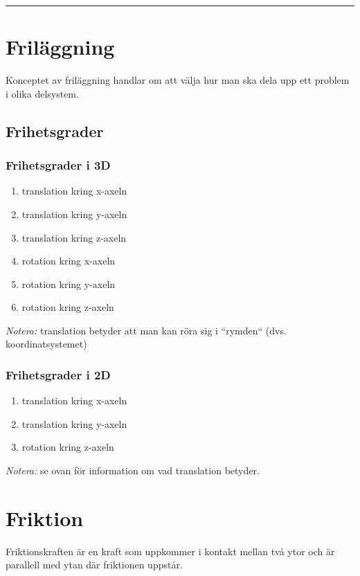 \documentclass{article}
\newenvironment{ankiflashcard}[1]{}{}
\newcommand{\ruler}{
\rule{0.5\textwidth}{0.5pt}
}
\begin{document}
\begin{paracol}{2}
\ruler
\section{Friläggning}
Konceptet av friläggning handlar om att välja hur man ska dela upp ett problem i olika delsystem.

    
\subsection{Frihetsgrader}
\begin{ankiflashcard}{Vilka frihetsgrader finns i 3D?}
\subsubsection{Frihetsgrader i 3D}

\begin{enumerate}[label*=\protect\fbox{\arabic{enumi}}]
\item translation kring x-axeln
\item translation kring y-axeln
\item translation kring z-axeln
\item rotation kring x-axeln
\item rotation kring y-axeln
\item rotation kring z-axeln
\end{enumerate}
\textit{Notera:} translation betyder att man kan röra sig i ``rymden`` (dvs. koordinatsystemet)
\end{ankiflashcard}

\begin{ankiflashcard}{Vilka frietsgrader finns i 2D?}
    
\subsubsection{Frihetsgrader i 2D}
\begin{enumerate}[label*=\protect\fbox{\arabic{enumi}}]
\item translation kring x-axeln
\item translation kring y-axeln
\item rotation kring z-axeln
\end{enumerate}
\textit{Notera:} se ovan för information om vad translation betyder.
\end{ankiflashcard}
    
\section{Friktion}
Friktionskraften är en kraft som uppkommer i kontakt mellan två ytor och är parallell med ytan där friktionen uppstår.


\end{paracol}
\end{document}
